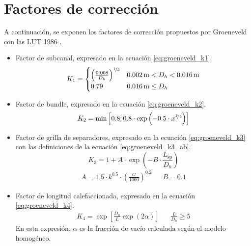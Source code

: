 \section{Factores de corrección}
A continuación, se exponen los factores de corrección propuestos por Groeneveld con las LUT 1986 \citep{GROENEVELD1986}.
\begin{itemize}
    \item Factor de subcanal, expresado en la ecuación \ref{eq:groeneveld_k1}.
    \begin{equation}
        \label{eq:groeneveld_k1}
        K_1 = \begin{cases}
            \left( \frac{0.008}{D_h} \right)^{\nicefrac{1}{3}} & 0.002\,\mathrm{m} < D_h < 0.016\,\mathrm{m} \\
            0.79 & 0.016\,\mathrm{m} \leq D_h
        \end{cases}
    \end{equation}

    \item Factor de bundle, expresado en la ecuación \ref{eq:groeneveld_k2}.
    \begin{equation}
        \label{eq:groeneveld_k2}
        K_2 = \min{\left[ 0.8; 0.8\cdot \exp{\left(-0.5\cdot x^{\nicefrac{1}{3}} \right)}  \right]}
    \end{equation}

    \item Factor de grilla de separadores, expresado en la ecuación \ref{eq:groeneveld_k3} con las definiciones de la ecuación \ref{eq:groeneveld_k3_ab}.
    \begin{equation}
        \label{eq:groeneveld_k3}
        K_3 = 1 + A \cdot \exp{\left( -B \cdot \frac{L_\mathrm{sp}}{D_h} \right)} 
    \end{equation}
    \begin{align}
        \label{eq:groeneveld_k3_ab}
        A = 1.5\cdot k^{0.5}\cdot \left(\frac{G}{1000}\right)^{0.2} && B=0.1
    \end{align}

    \item Factor de longitud calefaccionada, expresado en la ecuación \ref{eq:groeneveld_k4}.
    \begin{align}
        \label{eq:groeneveld_k4}
        K_4 = \exp{\left[ \frac{D_h}{L} \exp{(2\alpha)} \right]} && \frac{L}{D_h}\geq 5
    \end{align}
    En esta expresión, $\alpha$ es la fracción de vacío calculada según el modelo homogéneo.


\end{itemize}
